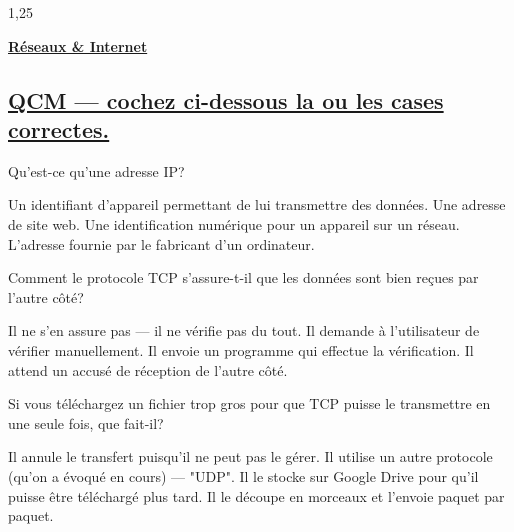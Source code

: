 \documentclass[11pt,a4paper]{exam}
\begin{document}
\begin{spacing}{1,25}
\begin{questions}
\begin{parts}
\begin{subparts}
        		\end{subparts}
        		
        	\end{parts}
        	
        	\noaddpoints
			\question[11] \underline{\textbf{Réseaux \& Internet}}
			\addpoints
			\begin{parts}
				\part{\underline{QCM --- cochez ci-dessous la ou les cases correctes.}}
				\begin{subparts}
					\subpart[1]Qu'est-ce qu'une adresse IP?
					\begin{checkboxes}
						\correctchoice Un identifiant d'appareil permettant de lui transmettre des données.
						\choice Une adresse de site web.
						\correctchoice Une identification numérique pour un appareil sur un réseau.
						\choice L'adresse fournie par le fabricant d'un ordinateur.
					\end{checkboxes}
					\subpart[1]Comment le protocole TCP s'assure-t-il que les données sont bien reçues par l'autre côté?
					\begin{checkboxes}
						\choice Il ne s'en assure pas --- il ne vérifie pas du tout.
						\choice Il demande à l'utilisateur de vérifier manuellement.
						\choice Il envoie un programme qui effectue la vérification.
						\correctchoice Il attend un accusé de réception de l'autre côté.
					\end{checkboxes}
					\subpart[1] Si vous téléchargez un fichier trop gros pour que TCP puisse le transmettre en une seule fois, que fait-il?
					\begin{checkboxes}
						\choice Il annule le transfert puisqu'il ne peut pas le gérer.
						\choice Il utilise un autre protocole (qu'on a évoqué en cours) --- "UDP".
						\choice Il le stocke sur Google Drive pour qu'il puisse être téléchargé plus tard.
						\correctchoice Il le découpe en morceaux et l'envoie paquet par paquet.
					\end{checkboxes}
				\end{subparts}

\end{parts}
\end{questions}
\end{spacing}
\end{document}
